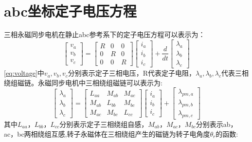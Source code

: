 \section{abc坐标定子电压方程}
三相永磁同步电机在静止abc参考系下的定子电压方程可以表示为：
\begin{equation}\label{eq:voltage}
\begin{bmatrix}v_{a}\\v_{b}\\v_{c} \end{bmatrix}
=
\begin{bmatrix}R&0&0\\0&R&0\\0&0&R\end{bmatrix}
\begin{bmatrix} i_{a}\\i_{b}\\i_{c}\end{bmatrix}
+
\frac d{dt} \begin{bmatrix}\lambda_{a}\\\lambda_{b}\\\lambda_{c}\end{bmatrix}
\end{equation} 
\ref{eq:voltage}中$v_{a},v_{b},v_{c}$分别表示定子三相电压，R代表定子电阻，$\lambda_{a},\lambda_{b},\lambda_{c}$代表三相绕组磁链。永磁同步电机中三相绕组磁链可以表示为:
\begin{equation}
\begin{bmatrix}\label{eq:flux}
\lambda_{a}\\\lambda_{b}\\\lambda_{c}\end{bmatrix}=\begin{bmatrix}
L_{aa}&M_{ab}&M_{ac}\\M_{ab}&L_{bb}&M_{bc}\\M_{ac}&M_{bc}&L_{cc}
\end{bmatrix}
\begin{bmatrix}
i_{a}\\i_{b}\\i_{c}
\end{bmatrix}
+\begin{bmatrix}\lambda_{pm,a}\\\lambda_{pm,b}\\\lambda_{pm,c}\end{bmatrix}
\end{equation}
其中$L_{aa}$，$L_{bb}$，$L_{cc}$分别表示定子三相绕组自感，$M_{ab}$，$M_{ac}$，$M_{bc}$分别表示ab，ac，bc两相绕组互感,转子永磁体在三相绕组产生的磁链为转子电角度$\theta_{r}$的函数:
